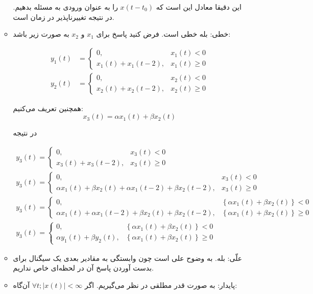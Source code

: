 \documentclass[12pt]{article}
\begin{document}
\begin{enumerate}[label = \harfi*)]
\begin{itemize}
	 این دقیقا معادل این است که $x(t-t_0)$ را به عنوان ورودی به مسئله بدهیم. در نتیجه تغییرناپذیر در زمان است.
 
	\item
	خطی:  بله خطی است. فرض کنید پاسخ برای $x_1$ و $x_2$ به صورت زیر باشد:
	
	$$
	\begin{array}{ll}
		y_{1}(t) & =\left\{\begin{array}{ll}
			0, & x_{1}(t)<0 \\
			x_{1}(t)+x_{1}(t-2), & x_{1}(t) \geq 0
		\end{array}\right. \\
		y_{2}(t) & =\left\{\begin{array}{ll}
			0, & x_{2}(t)<0 \\
			x_{2}(t)+x_{2}(t-2), & x_{2}(t) \geq 0
		\end{array}\right.
	\end{array}
	$$
	
	همچنین تعریف می‌کنیم:
	$$x_3(t) = \alpha x_1(t) + \beta x_2(t)$$
	
	در نتیجه
	
	$$
	\begin{array}{l}
		y_{3}(t)=\left\{\begin{array}{ll}
			0, & x_{3}(t)<0 \\
			x_{3}(t)+x_{3}(t-2), & x_{3}(t) \geq 0
		\end{array}\right. \\
		y_{3}(t)=\left\{\begin{array}{ll}
			0, & x_{3}(t)<0 \\
			\alpha x_{1}(t)+\beta x_{2}(t)+\alpha x_{1}(t-2)+\beta x_{2}(t-2), & x_{3}(t) \geq 0
		\end{array}\right. \\
		y_{3}(t)=\left\{\begin{array}{ll}
			0, & \left\{\alpha x_{1}(t)+\beta x_{2}(t)\right\}<0 \\
			\alpha x_{1}(t)+\alpha x_{1}(t-2)+\beta x_{2}(t)+\beta x_{2}(t-2), & \left\{\alpha x_{1}(t)+\beta x_{2}(t)\right\} \geq 0
		\end{array}\right. \\
		y_{3}(t)=\left\{\begin{array}{ll}
			0, & \left\{\alpha x_{1}(t)+\beta x_{2}(t)\right\}<0 \\
			\alpha y_{1}(t)+\beta y_{2}(t), & \left\{\alpha x_{1}(t)+\beta x_{2}(t)\right\} \geq 0
		\end{array}\right.
	\end{array}
	$$
	\item
	علّی: بله. به وضوح علی است چون وابستگی به مقادیر بعدی یک سیگنال برای بدست آوردن پاسخ آن در لحظه‌ای خاص نداریم.
	\item
	پایدار: به صورت قدر مطلقی در نظر می‌گیریم. اگر
	$\forall t; |x(t)| < \infty$
	آن‌گاه:
	

\end{itemize}
\end{enumerate}
\end{document}
